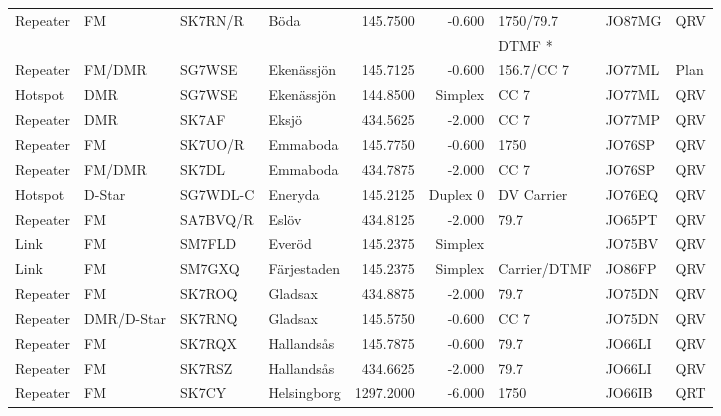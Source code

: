 \begin{longtable}{llllrrlll}
Repeater & FM              & SK7RN/R  & Böda         & 145.7500     & -0.600     & 1750/79.7    & JO87MG      & QRV      \\
         &                 &          &              &              &            & DTMF *       &             &          \\
Repeater & FM/DMR          & SG7WSE   & Ekenässjön   & 145.7125     & -0.600     & 156.7/CC 7   & JO77ML      & Plan     \\
Hotspot  & DMR             & SG7WSE   & Ekenässjön   & 144.8500     & Simplex    & CC 7         & JO77ML      & QRV      \\
Repeater & DMR             & SK7AF    & Eksjö        & 434.5625     & -2.000     & CC 7         & JO77MP      & QRV      \\
Repeater & FM              & SK7UO/R  & Emmaboda     & 145.7750     & -0.600     & 1750         & JO76SP      & QRV      \\
Repeater & FM/DMR          & SK7DL    & Emmaboda     & 434.7875     & -2.000     & CC 7         & JO76SP      & QRV      \\
Hotspot  & D-Star          & SG7WDL-C & Eneryda      & 145.2125     & Duplex 0   & DV Carrier   & JO76EQ      & QRV      \\
Repeater & FM              & SA7BVQ/R & Eslöv        & 434.8125     & -2.000     & 79.7         & JO65PT      & QRV      \\
Link     & FM              & SM7FLD   & Everöd       & 145.2375     & Simplex    &              & JO75BV      & QRV      \\
Link     & FM              & SM7GXQ   & Färjestaden  & 145.2375     & Simplex    & Carrier/DTMF & JO86FP      & QRV      \\
Repeater & FM              & SK7ROQ   & Gladsax      & 434.8875     & -2.000     & 79.7         & JO75DN      & QRV      \\
Repeater & DMR/D-Star      & SK7RNQ   & Gladsax      & 145.5750     & -0.600     & CC 7         & JO75DN      & QRV      \\
Repeater & FM              & SK7RQX   & Hallandsås   & 145.7875     & -0.600     & 79.7         & JO66LI      & QRV      \\
Repeater & FM              & SK7RSZ   & Hallandsås   & 434.6625     & -2.000     & 79.7         & JO66LI      & QRV      \\
Repeater & FM              & SK7CY    & Helsingborg  & 1297.2000    & -6.000     & 1750         & JO66IB      & QRT      \\

\end{longtable}
